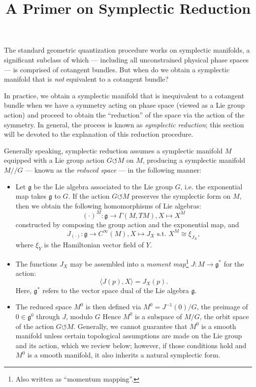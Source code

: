\documentclass{tufte-handout}
\title{A Primer on Symplectic Reduction}
\begin{document}
The standard geometric quantization procedure works on symplectic manifolds, a significant subclass of which --- including all unconstrained physical phase spaces --- is comprised of cotangent bundles. But when do we obtain a symplectic manifold that is \emph{not} equivalent to a cotangent bundle?

In practice, we obtain a symplectic manifold that is inequivalent to a cotangent bundle when we have a symmetry acting on phase space (viewed as a Lie group action) and proceed to obtain the ``reduction'' of the space via the action of the symmetry. In general, the process is known as \emph{symplectic reduction}; this section will be devoted to the explanation of this reduction procedure.

Generally speaking, symplectic reduction assumes a symplectic manifold $M$ equipped with a Lie group action $G \circlearrowleft M$ on $M$, producing a symplectic manifold $M // G$ --- known as the \emph{reduced space} --- in the following manner:

\begin{itemize}
\item Let $\mathfrak{g}$ be the Lie algebra associated to the Lie group $G$, i.e. the exponential map takes $\mathfrak{g}$ to $G$. If the action $G \circlearrowleft M$ preserves the symplectic form on $M$, then we obtain the following homomorphisms of Lie algebras:
$$
(\cdot)^M : \mathfrak{g} \to \Gamma(M,TM), X \mapsto X^M
$$
constructed by composing the group action and the exponential map, and  %
$$
J_{(\cdot)}: \mathfrak{g} \to C^\infty(M), X \mapsto J_X \mbox{ s.t. } X^M \cong \xi_{J_X},
$$
where $\xi_Y$ is the Hamiltonian vector field of $Y$.

\item The functions $J_X$ may be assembled into a \emph{moment map}\footnote{Also written as ``momentum mapping''.} $J: M \to \mathfrak{g}^*$ for the action:
$$
\langle J(p) , X \rangle = J_X(p).
$$
Here, $\mathfrak{g}^*$ refers to the vector space dual of the Lie algebra $\mathfrak{g}$.

\item The reduced space $M^0$ is then defined via $M^0 = J^{-1}(0) / G$, the preimage of $0 \in \mathfrak{g}^0$ through $J$, modulo $G$ Hence $M^0$ is a subspace of $M / G$, the orbit space of the action $G \circlearrowleft M$. Generally, we cannot guarantee that $M^0$ is a smooth manifold unless certain topological assumptions are made on the Lie group and its action, which we review below; however, if those conditions hold and $M^0$ is a smooth manifold, it also inherits a natural symplectic form.
\end{itemize}
\end{document}
